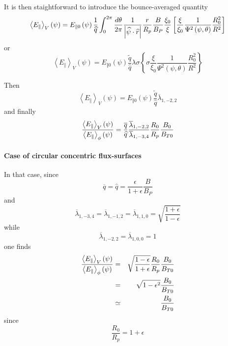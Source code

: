 \documentclass[12pt,a4paper]{article}
\begin{document}
It is then staightforward to introduce the bounce-averaged quantity 
\begin{equation}
\left\langle E_{\Vert }\right\rangle _{V}\left( \psi \right) =E_{\Vert
0}\left( \psi \right) \frac{1}{\widehat{q}}\int_{0}^{2\pi }\frac{d\theta }{%
2\pi }\frac{1}{\left\vert \widehat{\psi }\cdot \widehat{r}\right\vert }\frac{%
r}{R_{p}}\frac{B}{B_{P}}\frac{\xi _{0}}{\xi }\left[ \frac{\xi }{\xi _{0}}%
\frac{1}{\Psi ^{2}\left( \psi ,\theta \right) }\frac{R_{0}^{2}}{R^{2}}\right]
\end{equation}%
or%
\begin{equation}
\left\langle E_{\Vert }\right\rangle _{V}\left( \psi \right) =E_{\Vert
0}\left( \psi \right) \frac{\widetilde{q}}{\widehat{q}}\lambda \sigma
\left\{ \sigma \frac{\xi }{\xi _{0}}\frac{1}{\Psi ^{2}\left( \psi ,\theta
\right) }\frac{R_{0}^{2}}{R^{2}}\right\} 
\end{equation}

Then%
\begin{equation}
\left\langle E_{\Vert }\right\rangle _{V}\left( \psi \right) =E_{\Vert
0}\left( \psi \right) \frac{\widetilde{q}}{\widehat{q}}\overline{\lambda }%
_{1,-2,2}
\end{equation}%
and finally%
\begin{equation}
\frac{\left\langle E_{\Vert }\right\rangle _{V}\left( \psi \right) }{%
\left\langle E_{\Vert }\right\rangle _{\phi }\left( \psi \right) }=\frac{%
\overline{q}}{\widehat{q}}\frac{\overline{\lambda }_{1,-2,2}}{\overline{%
\lambda }_{1,-3,4}}\frac{R_{0}}{R_{p}}\frac{B_{0}}{B_{T0}}
\end{equation}

\paragraph{Case of circular concentric flux-surfaces}

In that case, since 
\begin{equation}
\overline{q}=\widehat{q}=\frac{\epsilon }{1+\epsilon }\frac{B}{B_{P}}
\end{equation}%
and%
\begin{equation}
\overline{\lambda }_{1,-3,4}=\overline{\lambda }_{1,-1,2}=\overline{\lambda }%
_{1,1,0}=\sqrt{\frac{1+\epsilon }{1-\epsilon }}
\end{equation}%
while%
\begin{equation}
\overline{\lambda }_{1,-2,2}=\overline{\lambda }_{1,0,0}=1
\end{equation}%
one finds%
\begin{eqnarray*}
\frac{\left\langle E_{\Vert }\right\rangle _{V}\left( \psi \right) }{%
\left\langle E_{\Vert }\right\rangle _{\phi }\left( \psi \right) } &=&\sqrt{%
\frac{1-\epsilon }{1+\epsilon }}\frac{R_{0}}{R_{p}}\frac{B_{0}}{B_{T0}} \\
&=&\sqrt{1-\epsilon ^{2}}\frac{B_{0}}{B_{T0}} \\
&\simeq &\frac{B_{0}}{B_{T0}}
\end{eqnarray*}%
since 
\begin{equation}
\frac{R_{0}}{R_{p}}=1+\epsilon 
\end{equation}
\end{document}

